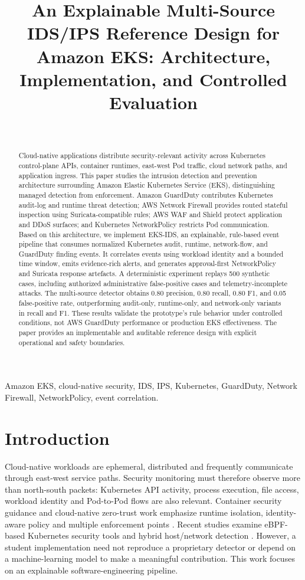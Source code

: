 \documentclass[conference]{IEEEtran}
\title{An Explainable Multi-Source IDS/IPS Reference Design for Amazon EKS: Architecture, Implementation, and Controlled Evaluation}
\author{\IEEEauthorblockN{23BCS017, 23BCS089, 23BDS045}\\
\IEEEauthorblockA{Indian Institute of Information Technology, Dharwad}}
\begin{document}
\maketitle
\begin{abstract}
Cloud-native applications distribute security-relevant activity across Kubernetes control-plane APIs, container runtimes, east-west Pod traffic, cloud network paths, and application ingress. This paper studies the intrusion detection and prevention architecture surrounding Amazon Elastic Kubernetes Service (EKS), distinguishing managed detection from enforcement. Amazon GuardDuty contributes Kubernetes audit-log and runtime threat detection; AWS Network Firewall provides routed stateful inspection using Suricata-compatible rules; AWS WAF and Shield protect application and DDoS surfaces; and Kubernetes NetworkPolicy restricts Pod communication. Based on this architecture, we implement EKS-IDS, an explainable, rule-based event pipeline that consumes normalized Kubernetes audit, runtime, network-flow, and GuardDuty finding events. It correlates events using workload identity and a bounded time window, emits evidence-rich alerts, and generates approval-first NetworkPolicy and Suricata response artefacts. A deterministic experiment replays 500 synthetic cases, including authorized administrative false-positive cases and telemetry-incomplete attacks. The multi-source detector obtains 0.80 precision, 0.80 recall, 0.80 F1, and 0.05 false-positive rate, outperforming audit-only, runtime-only, and network-only variants in recall and F1. These results validate the prototype's rule behavior under controlled conditions, not AWS GuardDuty performance or production EKS effectiveness. The paper provides an implementable and auditable reference design with explicit operational and safety boundaries.
\end{abstract}
\begin{IEEEkeywords}
Amazon EKS, cloud-native security, IDS, IPS, Kubernetes, GuardDuty, Network Firewall, NetworkPolicy, event correlation.
\end{IEEEkeywords}

\section{Introduction}
Cloud-native workloads are ephemeral, distributed and frequently communicate through east-west service paths. Security monitoring must therefore observe more than north-south packets: Kubernetes API activity, process execution, file access, workload identity and Pod-to-Pod flows are also relevant. Container security guidance and cloud-native zero-trust work emphasize runtime isolation, identity-aware policy and multiple enforcement points \cite{nist190,nist207a,nist233}. Recent studies examine eBPF-based Kubernetes security tools and hybrid host/network detection \cite{her2025,ryu2026,oppong2026}. However, a student implementation need not reproduce a proprietary detector or depend on a machine-learning model to make a meaningful contribution. This work focuses on an explainable software-engineering pipeline.
\end{document}
